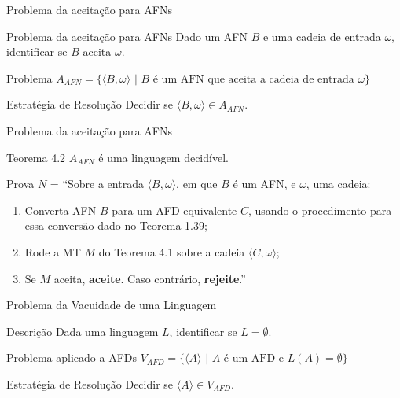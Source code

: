 \documentclass[xcolor=dvipsnames,table]{beamer}
\begin{document}
	\begin{frame}{Problema da aceitação para AFNs}
		\begin{block}{Problema da aceitação para AFNs}
			Dado um AFN $B$ e uma cadeia de entrada $\omega$, identificar se $B$ aceita $\omega$.
		\end{block}	 
		\begin{block}{Problema}
			$A_{AFN} = \{ \langle B, \omega \rangle \mbox{ | } B \mbox{ é um AFN que aceita a cadeia de entrada } \omega \}$
		\end{block}  
		\begin{block}{Estratégia de Resolução}
			Decidir se $\langle B, \omega \rangle \in A_{AFN}$.
		\end{block}
	\end{frame}	
	
	\begin{frame}{Problema da aceitação para AFNs}
		\begin{block}{Teorema 4.2}
			$A_{AFN}$ é uma linguagem decidível.
		\end{block}  
		\begin{block}{Prova}
			$N$ = ``Sobre a entrada $\langle B, \omega \rangle$, em que $B$ é um AFN, e $\omega$, uma cadeia:
			\begin{enumerate}
				\item Converta AFN $B$ para um AFD equivalente $C$, usando o procedimento para essa conversão dado no Teorema 1.39;
				\item Rode a MT $M$ do Teorema 4.1 sobre a cadeia $\langle C, \omega \rangle$;
				\item Se $M$ aceita, {\bf aceite}. Caso contrário, {\bf rejeite}.''
			\end{enumerate}
		\end{block}
	\end{frame}
	
	\begin{frame}{Problema da Vacuidade de uma Linguagem}
		\begin{block}{Descrição}
			Dada uma linguagem $L$, identificar se $L = \emptyset$.
		\end{block}	
		\begin{block}{Problema aplicado a AFDs}
			$V_{AFD} = \{ \langle A \rangle \mbox{ | } A \mbox{ é um AFD e } L(A) = \emptyset \}$
		\end{block} 
		\begin{block}{Estratégia de Resolução}
			Decidir se $\langle A \rangle \in V_{AFD}$.
		\end{block}
	\end{frame}	
	
\end{document}
